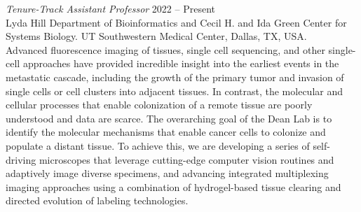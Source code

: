 \documentclass[10pt]{res}
\begin{document}
\begin{resume}
{\sl Tenure-Track Assistant Professor} \hfill 2022 -- Present \\ 
Lyda Hill Department of Bioinformatics and Cecil H. and Ida Green Center for Systems Biology. \newline UT Southwestern Medical Center, Dallas, TX, USA. \hfill \\
Advanced fluorescence imaging of tissues, single cell sequencing, and other single-cell approaches have provided incredible insight into the earliest events in the metastatic cascade, including the growth of the primary tumor and invasion of single cells or cell clusters into adjacent tissues. In contrast, the molecular and cellular processes that enable colonization of a remote tissue are poorly understood and data are scarce. The overarching goal of the Dean Lab is to identify the molecular mechanisms that enable cancer cells to colonize and populate a distant tissue. To achieve this, we are developing a series of self-driving microscopes that leverage cutting-edge computer vision routines and adaptively image diverse specimens, and advancing integrated multiplexing imaging approaches using a combination of hydrogel-based tissue clearing and directed evolution of labeling technologies. 
\newline


\end{resume}
\end{document}

